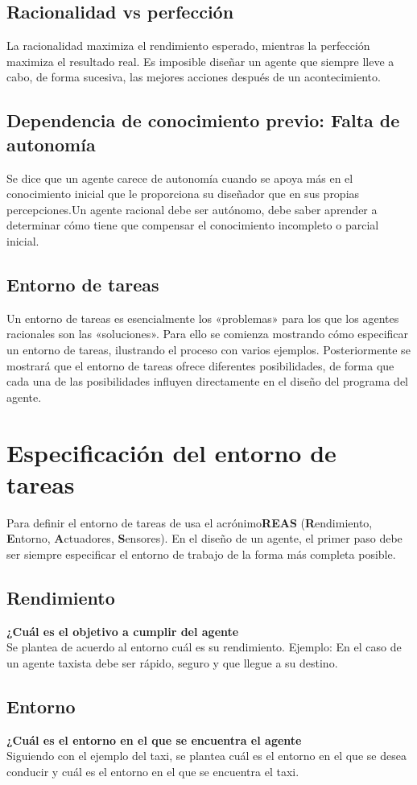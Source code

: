 \documentclass[12pt,a4paper]{report}
\begin{document}
\subsection*{Racionalidad vs perfección}
La racionalidad maximiza el rendimiento esperado, mientras la perfección maximiza el resultado real. Es imposible diseñar un agente que siempre lleve a cabo, de forma sucesiva, las mejores acciones después de un acontecimiento.
\subsection*{Dependencia de conocimiento previo: Falta de autonomía}
Se dice que un agente carece de autonomía cuando se apoya más en el conocimiento inicial que le proporciona su diseñador que en sus propias percepciones.Un agente racional debe ser autónomo, debe saber aprender a determinar cómo tiene que compensar el conocimiento incompleto o parcial inicial.
\subsection*{Entorno de tareas}
Un entorno de tareas es esencialmente los «problemas» para los que los agentes racionales son las «soluciones». Para ello se comienza mostrando cómo especificar un entorno de tareas, ilustrando el proceso con varios ejemplos. Posteriormente se mostrará que el entorno de tareas ofrece diferentes posibilidades, de forma que cada una de las posibilidades influyen directamente en el diseño del programa del agente.
\section{Especificación del entorno de tareas}
Para definir el entorno de tareas de usa el acrónimo\textbf{REAS} (\textbf{R}endimiento, \textbf{E}ntorno, \textbf{A}ctuadores, \textbf{S}ensores). En el diseño de un agente, el primer paso debe ser siempre especificar el entorno de trabajo de la forma más completa posible.
\subsection*{Rendimiento}
\textbf{¿Cuál es el objetivo a cumplir del agente}\\Se plantea de acuerdo al entorno cuál es su rendimiento. Ejemplo: En el caso de un agente taxista debe ser rápido, seguro y que llegue a su destino.
\subsection*{Entorno}
\textbf{¿Cuál es el entorno en el que se encuentra el agente}\\Siguiendo con el ejemplo del taxi, se plantea cuál es el entorno en el que se desea conducir y cuál es el entorno en el que se encuentra el taxi.  
\end{document}
